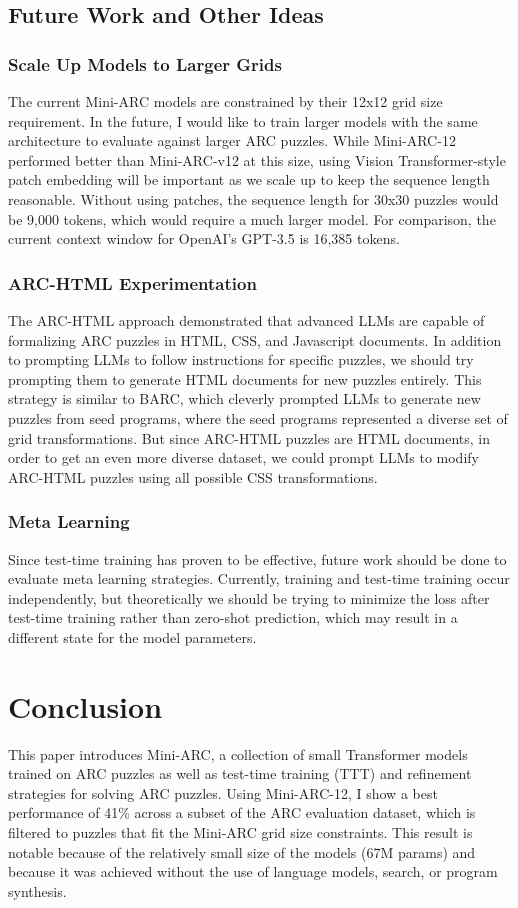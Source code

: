 \documentclass[10pt,twocolumn]{article}
\begin{document}
\subsection{Future Work and Other Ideas}
\subsubsection{Scale Up Models to Larger Grids}
The current Mini-ARC models are constrained by their 12x12 grid size
requirement. In the future, I would like to train larger models with
the same architecture to evaluate against larger ARC puzzles. While
Mini-ARC-12 performed better than Mini-ARC-v12 at this size, using
Vision Transformer-style patch embedding will be important as we
scale up to keep the sequence length reasonable. Without using
patches, the sequence length for 30x30 puzzles would be 9,000 tokens,
which would require a much larger model.
For comparison, the current context window for OpenAI's GPT-3.5 is
16,385 tokens.

\subsubsection{ARC-HTML Experimentation}
The ARC-HTML approach demonstrated that advanced LLMs are capable of
formalizing ARC puzzles in HTML, CSS, and Javascript documents.
In addition to prompting LLMs to follow instructions for specific
puzzles, we should try prompting them to generate HTML documents for
new puzzles entirely. This strategy is similar to BARC\cite{barc},
which cleverly prompted LLMs to generate new puzzles from seed
programs, where the seed programs represented a diverse set of grid
transformations. But since ARC-HTML puzzles are HTML documents, in
order to get an even more diverse dataset, we could prompt LLMs to
modify ARC-HTML puzzles using all possible CSS transformations.

\subsubsection{Meta Learning}
Since test-time training has proven to be effective, future work
should be done to evaluate meta learning strategies\cite{maml}.
Currently, training and test-time training occur independently, but
theoretically we should be trying to minimize the loss after
test-time training rather than zero-shot prediction, which may result in a
different state for the model parameters.

\section{Conclusion}
This paper introduces Mini-ARC, a collection of small Transformer models
trained on ARC puzzles as well as test-time training (TTT) and refinement
strategies for solving ARC puzzles. Using Mini-ARC-12, I show a best
performance of 41\%
across a subset of the ARC evaluation dataset, which is filtered to
puzzles that fit the Mini-ARC grid size constraints. This result is
notable because of the relatively small
size of the models (67M params) and because it was achieved without
the use of language models, search, or program synthesis.
\end{document}
